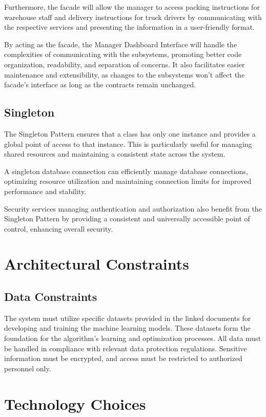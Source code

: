 \documentclass[a4paper,12pt]{article}
\begin{document}
Furthermore, the facade will allow the manager to access packing instructions for warehouse staff and delivery instructions for truck drivers by communicating with the respective services and presenting the information in a user-friendly format.

By acting as the facade, the Manager Dashboard Interface will handle the complexities of communicating with the subsystems, promoting better code organization, readability, and separation of concerns. It also facilitates easier maintenance and extensibility, as changes to the subsystems won't affect the facade's interface as long as the contracts remain unchanged.

\subsection{Singleton}
The Singleton Pattern ensures that a class has only one instance and provides a global point of access to that instance. This is particularly useful for managing shared resources and maintaining a consistent state across the system.

A singleton database connection can efficiently manage database connections, optimizing resource utilization and maintaining connection limits for improved performance and stability.

Security services managing authentication and authorization also benefit from the Singleton Pattern by providing a consistent and universally accessible point of control, enhancing overall security.

\section{Architectural Constraints}
\subsection{Data Constraints}
The system must utilize specific datasets provided in the linked documents for developing and training the machine learning models. These datasets form the foundation for the algorithm's learning and optimization processes. All data must be handled in compliance with relevant data protection regulations. Sensitive information must be encrypted, and access must be restricted to authorized personnel only.

\section{Technology Choices}
\end{document}
